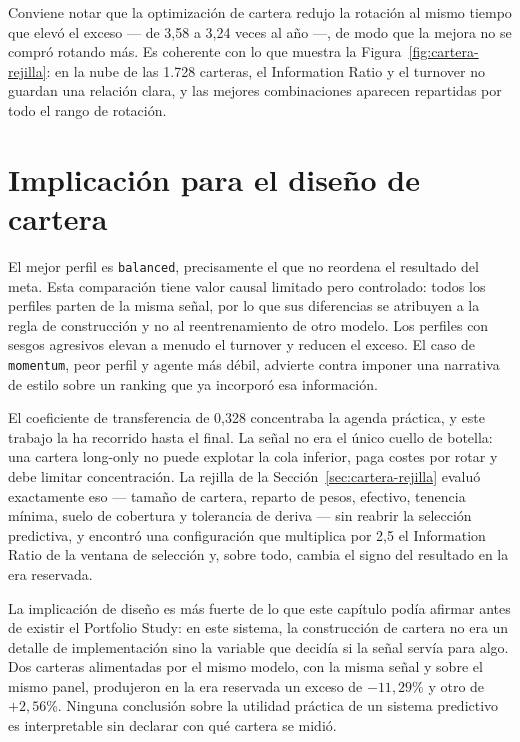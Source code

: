 Conviene notar que la optimización de cartera redujo la rotación al mismo tiempo que elevó el
exceso --- de 3,58 a 3,24 veces al año ---, de modo que la mejora no se compró rotando más. Es
coherente con lo que muestra la Figura~\ref{fig:cartera-rejilla}: en la nube de las 1.728 carteras,
el Information Ratio y el turnover no guardan una relación clara, y las mejores combinaciones
aparecen repartidas por todo el rango de rotación.

\section{Implicación para el diseño de cartera}

El mejor perfil es \texttt{balanced}, precisamente el que no reordena el resultado del meta. Esta
comparación tiene valor causal limitado pero controlado: todos los perfiles parten de la misma señal,
por lo que sus diferencias se atribuyen a la regla de construcción y no al reentrenamiento de otro
modelo. Los perfiles con sesgos agresivos elevan a menudo el turnover y reducen el exceso. El caso
de \texttt{momentum}, peor perfil y agente más débil, advierte contra imponer una narrativa de estilo
sobre un ranking que ya incorporó esa información.

El coeficiente de transferencia de 0,328 concentraba la agenda práctica, y este trabajo la ha
recorrido hasta el final. La señal no era el único cuello de botella: una cartera long-only no puede
explotar la cola inferior, paga costes por rotar y debe limitar concentración. La rejilla de la
Sección~\ref{sec:cartera-rejilla} evaluó exactamente eso --- tamaño de cartera, reparto de pesos,
efectivo, tenencia mínima, suelo de cobertura y tolerancia de deriva --- sin reabrir la selección
predictiva, y encontró una configuración que multiplica por 2,5 el Information Ratio de la ventana
de selección y, sobre todo, cambia el signo del resultado en la era reservada.

La implicación de diseño es más fuerte de lo que este capítulo podía afirmar antes de existir el
Portfolio Study: en este sistema, la construcción de cartera no era un detalle de implementación
sino la variable que decidía si la señal servía para algo. Dos carteras alimentadas por el mismo
modelo, con la misma señal y sobre el mismo panel, produjeron en la era reservada un exceso de
$-11,29$\% y otro de $+2,56$\%. Ninguna conclusión sobre la utilidad práctica de un sistema
predictivo es interpretable sin declarar con qué cartera se midió.
